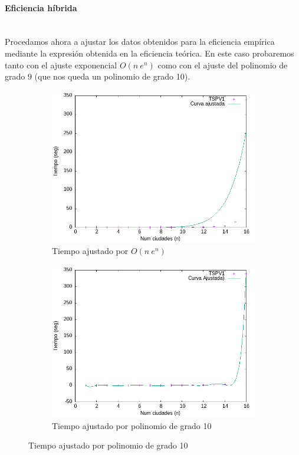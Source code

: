 \documentclass{article}
\newcommand{\myparagraph}[1]{\paragraph{#1}\mbox{}\\}
\begin{document}
\myparagraph{Eficiencia híbrida}

Procedamos ahora a ajustar los datos obtenidos para la eficiencia empírica mediante la expresión obtenida en la eficiencia teórica. En este caso probaremos tanto con el ajuste exponencial $O(n\:e^{n})$ como con el ajuste del polinomio de grado 9 (que nos queda un polinomio de grado 10).

\begin{figure}[H]
    \centering
    \begin{subfigure}[b]{0.45\textwidth}
    \centering
    \includegraphics[width=\textwidth]{imagenes/cota1/ef_bb/ef_ajustada.png}
    \caption{Tiempo ajustado por $O(n\:e^{n})$}
    \label{fig:enter-label}
    \end{subfigure}
    \begin{subfigure}[b]{0.45\textwidth}
    \centering
    \includegraphics[width=\textwidth]{imagenes/cota1/ef_bb/ef_ajustada_n10.png}
    \caption{Tiempo ajustado por polinomio de grado 10}
    \label{fig:enter-label1}
    \end{subfigure}
\end{figure}
\end{document}
